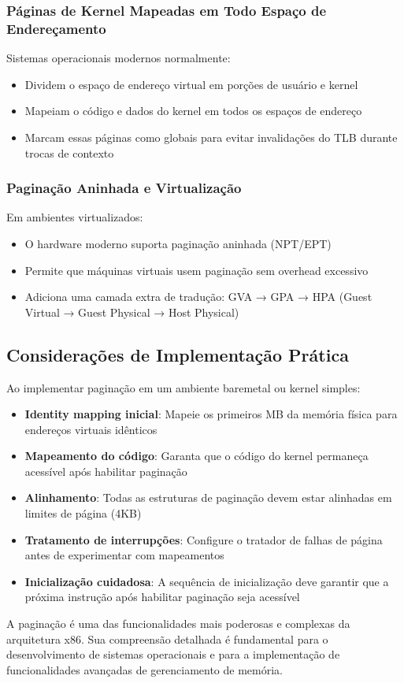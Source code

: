 \subsubsection{Páginas de Kernel Mapeadas em Todo Espaço de Endereçamento}

Sistemas operacionais modernos normalmente:
\begin{itemize}
    \item Dividem o espaço de endereço virtual em porções de usuário e kernel
    \item Mapeiam o código e dados do kernel em todos os espaços de endereço
    \item Marcam essas páginas como globais para evitar invalidações do TLB durante trocas de contexto
\end{itemize}

\subsubsection{Paginação Aninhada e Virtualização}

Em ambientes virtualizados:
\begin{itemize}
    \item O hardware moderno suporta paginação aninhada (NPT/EPT)
    \item Permite que máquinas virtuais usem paginação sem overhead excessivo
    \item Adiciona uma camada extra de tradução: GVA → GPA → HPA (Guest Virtual → Guest Physical → Host Physical)
\end{itemize}

\subsection{Considerações de Implementação Prática}
\label{subsec:implementacao_pratica}

Ao implementar paginação em um ambiente baremetal ou kernel simples:

\begin{itemize}
    \item \textbf{Identity mapping inicial}: Mapeie os primeiros MB da memória física para endereços virtuais idênticos
    \item \textbf{Mapeamento do código}: Garanta que o código do kernel permaneça acessível após habilitar paginação
    \item \textbf{Alinhamento}: Todas as estruturas de paginação devem estar alinhadas em limites de página (4KB)
    \item \textbf{Tratamento de interrupções}: Configure o tratador de falhas de página antes de experimentar com mapeamentos
    \item \textbf{Inicialização cuidadosa}: A sequência de inicialização deve garantir que a próxima instrução após habilitar paginação seja acessível
\end{itemize}

A paginação é uma das funcionalidades mais poderosas e complexas da arquitetura x86. Sua compreensão detalhada é fundamental para o desenvolvimento de sistemas operacionais e para a implementação de funcionalidades avançadas de gerenciamento de memória.
